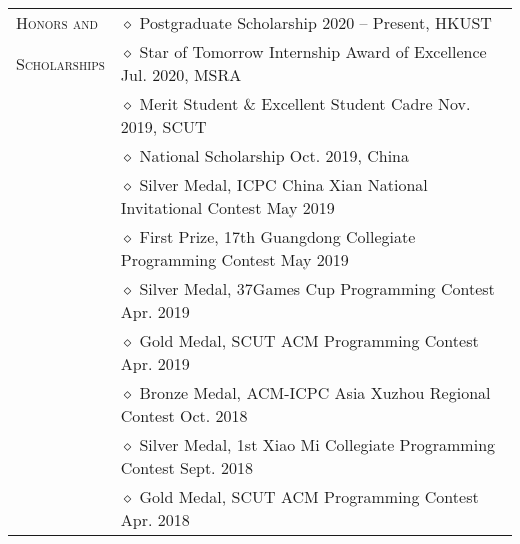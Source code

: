 \documentclass[letterpaper, 11pt]{article}
\begin{document}
\begin{longtable}{p{1in}p{5in}}
{\textsc{Honors and }}
& $\diamond$ Postgraduate Scholarship \hfill 2020 -- Present, HKUST \\
{\textsc{Scholarships}}
& $\diamond$ Star of Tomorrow Internship Award of Excellence \hfill Jul. 2020, MSRA \\

& $\diamond$ Merit Student \& Excellent Student Cadre \hfill Nov. 2019, SCUT \\
& $\diamond$ National Scholarship \hfill Oct. 2019, China \\

& $\diamond$ Silver Medal, ICPC China Xian National Invitational Contest \hfill May 2019 \\

& $\diamond$ First Prize, 17th Guangdong Collegiate Programming Contest \hfill May 2019 \\

& $\diamond$ Silver Medal, 37Games Cup Programming Contest \hfill Apr. 2019 \\

& $\diamond$ Gold Medal, SCUT ACM Programming Contest \hfill Apr. 2019 \\

& $\diamond$ Bronze Medal, ACM-ICPC Asia Xuzhou Regional Contest \hfill Oct. 2018 \\

& $\diamond$ Silver Medal, 1st Xiao Mi Collegiate Programming Contest \hfill Sept. 2018 \\

& $\diamond$ Gold Medal, SCUT ACM Programming Contest \hfill Apr. 2018 \\


\end{longtable}
\end{document}
